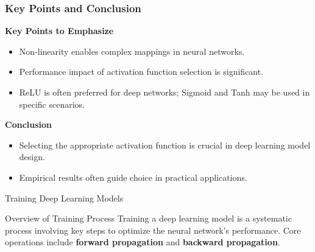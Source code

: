 \documentclass[aspectratio=169]{beamer}
\begin{document}
\begin{frame}[fragile]
    \frametitle{Key Points and Conclusion}
    \textbf{Key Points to Emphasize}
    \begin{itemize}
        \item Non-linearity enables complex mappings in neural networks.
        \item Performance impact of activation function selection is significant.
        \item ReLU is often preferred for deep networks; Sigmoid and Tanh may be used in specific scenarios.
    \end{itemize}

    \textbf{Conclusion}
    \begin{itemize}
        \item Selecting the appropriate activation function is crucial in deep learning model design.
        \item Empirical results often guide choice in practical applications.
    \end{itemize}
\end{frame}

\begin{frame}{Training Deep Learning Models}
    \begin{block}{Overview of Training Process}
        Training a deep learning model is a systematic process involving key steps to optimize the neural network's performance. Core operations include \textbf{forward propagation} and \textbf{backward propagation}.
    \end{block}
\end{frame}
\end{document}
